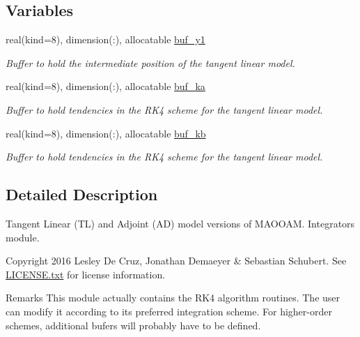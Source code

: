 \subsection*{Variables}
\begin{DoxyCompactItemize}
\item 
real(kind=8), dimension(\+:), allocatable \hyperlink{namespacerk4__tl__ad__integrator_a7a8fd6a2de598bb23bef4d88ddadbed2}{buf\+\_\+y1}
\begin{DoxyCompactList}\small\item\em Buffer to hold the intermediate position of the tangent linear model. \end{DoxyCompactList}\item 
real(kind=8), dimension(\+:), allocatable \hyperlink{namespacerk4__tl__ad__integrator_a076c0ff20536d9911a40c81565a0ba25}{buf\+\_\+ka}
\begin{DoxyCompactList}\small\item\em Buffer to hold tendencies in the R\+K4 scheme for the tangent linear model. \end{DoxyCompactList}\item 
real(kind=8), dimension(\+:), allocatable \hyperlink{namespacerk4__tl__ad__integrator_aed1e8c65a9882bdc18b4634fee0656f1}{buf\+\_\+kb}
\begin{DoxyCompactList}\small\item\em Buffer to hold tendencies in the R\+K4 scheme for the tangent linear model. \end{DoxyCompactList}\end{DoxyCompactItemize}


\subsection{Detailed Description}
Tangent Linear (TL) and Adjoint (AD) model versions of M\+A\+O\+O\+AM. Integrators module. 

\begin{DoxyCopyright}{Copyright}
2016 Lesley De Cruz, Jonathan Demaeyer \& Sebastian Schubert. See \hyperlink{LICENSE_8txt}{L\+I\+C\+E\+N\+S\+E.\+txt} for license information. 
\end{DoxyCopyright}
\begin{DoxyRemark}{Remarks}
This module actually contains the R\+K4 algorithm routines. The user can modify it according to its preferred integration scheme. For higher-\/order schemes, additional bufers will probably have to be defined. 
\end{DoxyRemark}


